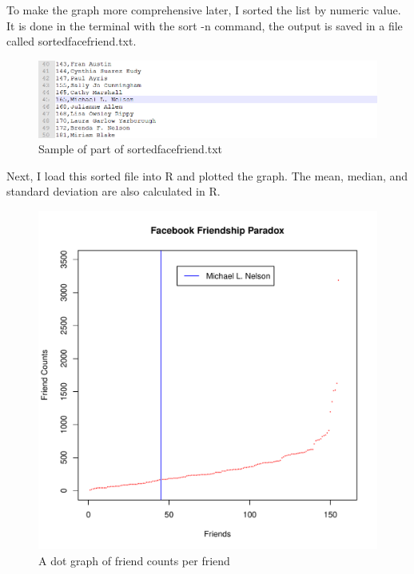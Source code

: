 \documentclass[12pt]{article}
\begin{document}


To make the graph more comprehensive later, I sorted the list by numeric value. It is done in the terminal with the sort -n command, the output is saved in a file called sortedfacefriend.txt.

\begin{figure}[h]
\centering
\includegraphics[width=6.5in]{sortedfacefriend.png}
\caption{Sample of part of sortedfacefriend.txt}
\end{figure}

Next, I load this sorted file into R and plotted the graph. The mean, median, and standard deviation are also calculated in R.



\begin{figure}[h]
\centering
\includegraphics[width=5in]{FaceFriends.pdf}
\caption{A dot graph of friend counts per friend}
\end{figure}
\end{document}
